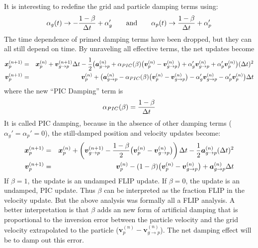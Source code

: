 \documentclass[11pt]{article}
\renewcommand{\vec}[1]{\boldsymbol{#1}}
\begin{document}
It is interesting to redefine the grid and particle damping terms using:
\begin{equation}
     \alpha_g(t) \to -{1-\beta\over\Delta t} + \alpha_g' \qquad{\rm and}\qquad \alpha_p(t) \to {1-\beta\over\Delta t} + \alpha_p'
     \label{PICDamping}
\end{equation}
The time dependence of primed damping terms have been dropped, but they can all still depend on time. 
By unraveling all effective terms, the net updates become
\begin{eqnarray}
   \vec{x}_{p}^{(n+1)} & = & \vec{x}_p^{(n)} +\vec v_{g\to p}^{(n+1)}\Delta t - {1 \over 2}\bigl(\vec{a}_{g\to p}^{(n)} 
       + \alpha_{PIC}(\beta)\bigl(\vec v_p^{(n)}-\vec v_{g\to p}^{(n)}\bigr) +   \alpha_g'\vec v_{g\to p}^{(n)}+  \alpha_p'\vec v_p^{(n)} \bigr)(\Delta t)^2  \\
   \vec{v}_{p}^{(n+1)} & = & \vec{v}_p^{(n)} + \bigl(\vec{a}_{g\to p}^{(n)} - \alpha_{PIC}(\beta)\bigl(\vec v_p^{(n)}-\vec v_{g\to p}^{(n)}\bigr)
         -  \alpha_g'\vec{v}_{g\to p}^{(n)} -  \alpha_p'\vec{v}_p^{(n)} \bigr)\Delta t 
\end{eqnarray}
where the new ``PIC Damping'' term is
\begin{equation}
       \alpha_{PIC}(\beta) = {1-\beta\over \Delta t}
\end{equation}
It is called PIC damping, because in the absence of other damping terms ($\alpha_g'=\alpha_p'=0$), the still-damped position and velocity updates become:
\begin{eqnarray}
   \vec{x}_{p}^{(n+1)} & = & \vec{x}_p^{(n)} +\left(\vec v_{g\to p}^{(n+1)} - {1-\beta \over 2}\bigl(\vec v_p^{(n)}-\vec v_{g\to p}^{(n)}\bigr) \right)\Delta t
          - {1 \over 2}\vec{a}_{g\to p}^{(n)} (\Delta t)^2  \\
   \vec{v}_{p}^{(n+1)} & = & \vec{v}_p^{(n)}  - (1-\beta)\bigl(\vec v_p^{(n)}-\vec v_{g\to p}^{(n)}\bigr)
         + \vec{a}_{g\to p}^{(n)}\Delta t 
\end{eqnarray}
If $\beta=1$, the update is an undamped FLIP update. If $\beta=0$, the update is an undamped, PIC update. Thus $\beta$ can be interpreted as the fraction FLIP in the velocity update. But the above analysis was formally all a FLIP analysis. A better interpretation is that $\beta$ adds an new form of artificial damping that is proportional to the inversion error between the particle velocity and the grid velocity extrapolated to the particle ($\vec v_p^{(n)}-\vec v_{g\to p}^{(n)}$). The net damping effect will be to damp out this error.
\end{document}
